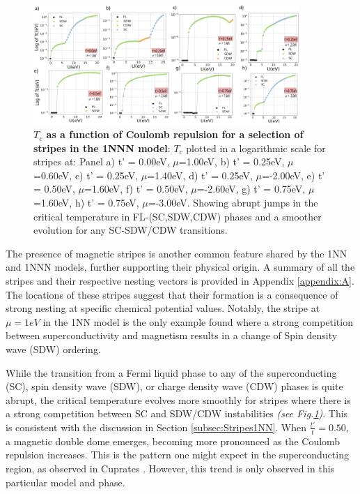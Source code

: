 \documentclass[11pt]{article}
\begin{document}
\begin{figure}[htbp]  %
    \centering
    \includegraphics[width=0.90\textwidth]{1NNNstripes.png}  %
    \caption{\textbf{$T_c$ as a function of Coulomb repulsion for a selection of stripes in the 1NNN model}: $T_c$ plotted in
    a logarithmic scale for stripes at:  Panel a) t' = 0.00eV, $\mu$=1.00eV, b) t' = 0.25eV, $\mu$=0.60eV, c) t' = 0.25eV, $\mu$=1.40eV,
    d) t' = 0.25eV, $\mu$=-2.00eV,
    e) t' = 0.50eV, $\mu$=1.60eV,
    f) t' = 0.50eV, $\mu$=-2.60eV,
    g) t' = 0.75eV, $\mu$=1.60eV, 
    h) t' = 0.75eV, $\mu$=-3.00eV.
    Showing abrupt jumps in the critical temperature in FL-(SC,SDW,CDW) phases and a smoother
    evolution for any SC-SDW/CDW transitions.  }
    \label{fig:1NNNStripes}
\end{figure}

\noindent The presence of magnetic stripes is another common feature shared by the 1NN and 1NNN models, 
further supporting their physical origin.
A summary of all the stripes and their respective nesting vectors is provided 
in Appendix \ref{appendix:A}. The locations of these
stripes suggest that their formation is a consequence of strong nesting at specific 
chemical potential values. 
Notably, the stripe at $\mu=1 eV$ in the 1NN model is the only example found where a strong 
competition between superconductivity and magnetism results in a change of Spin density wave (SDW) ordering.




\medskip 

\noindent While the transition from a Fermi liquid phase to any of the superconducting (SC), spin density wave (SDW), or charge density wave (CDW) phases is quite abrupt, the critical temperature
evolves more smoothly for stripes where there is a strong competition between SC and SDW/CDW instabilities \textit{(see Fig.\ref{fig:1NNNStripes})}. 
This is consistent with the discussion in Section \ref{subsec:Stripes1NN}. When $\frac{t'}{t} = 0.50$, a magnetic double dome emerges, becoming more pronounced as the Coulomb repulsion increases. 
This is the pattern one might expect in the superconducting region, as observed in Cuprates \cite{taillefer2010scattering}. 
However, this trend is only observed in this particular model and phase.
\end{document}
